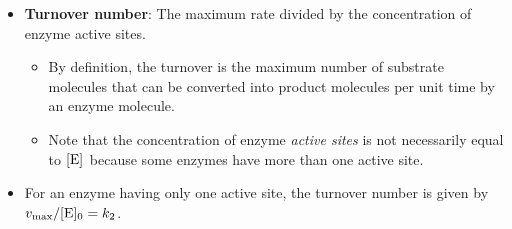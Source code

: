 \documentclass[../notes.tex]{subfiles}
\begin{document}
\begin{itemize}
\begin{itemize}
\begin{itemize}
        \end{itemize}
    \end{itemize}
    \item \textbf{Turnover number}: The maximum rate divided by the concentration of enzyme active sites.
    \begin{itemize}
        \item By definition, the turnover is the maximum number of substrate molecules that can be converted into product molecules per unit time by an enzyme molecule.
        \item Note that the concentration of enzyme \emph{active sites} is not necessarily equal to $\cnc{E}$ because some enzymes have more than one active site.
    \end{itemize}
    \item For an enzyme having only one active site, the turnover number is given by $v_\text{max}/\cnc[0]{E}=k_2$.
\end{itemize}
\end{document}

